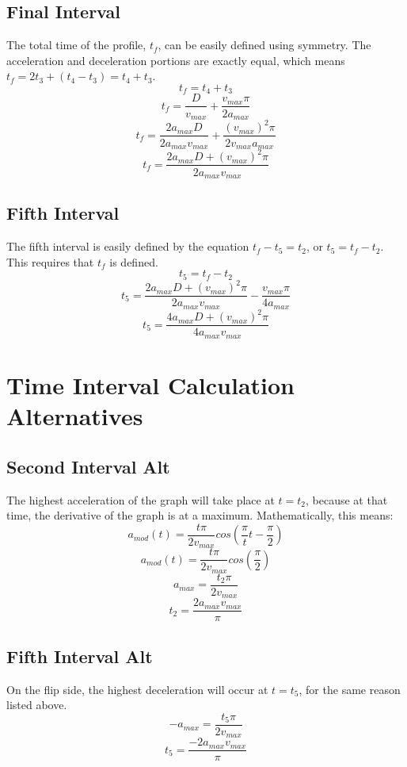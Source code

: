 \documentclass[a4paper,12pt]{report}
\newcommand{\tab}{\hspace{20pt}}
\begin{document}
	\section{Final Interval}
	\tab The total time of the profile, $t_f$, can be easily defined using symmetry. The acceleration and deceleration portions are exactly equal, which means $t_f = 2t_3 + (t_4 - t_3) = t_4 + t_3$.
	\[t_f = t_4 + t_3\]
	\[t_f = \frac{D}{v_{max}} + \frac{v_{max}\pi}{2a_{max}}\]
	\[t_f = \frac{2a_{max}D}{2a_{max}v_{max}} + \frac{(v_{max})^2\pi}{2v_{max}a_{max}}\]
	\[t_f = \frac{2a_{max}D + (v_{max})^2\pi}{2a_{max}v_{max}}\]
	
	\section{Fifth Interval}
	\tab The fifth interval is easily defined by the equation $t_f - t_5 = t_2$, or $t_5 = t_f - t_2$. This requires that $t_f$ is defined.
	\[t_5 = t_f - t_2\]
	\[t_5 = \frac{2a_{max}D + (v_{max})^2\pi}{2a_{max}v_{max}} - \frac{v_{max}\pi}{4a_{max}}\]
	\[t_5 = \frac{4a_{max}D + (v_{max})^2\pi}{4a_{max}v_{max}}\]
	
	\chapter{Time Interval Calculation Alternatives}
	\section{Second Interval Alt}
	\tab The highest acceleration of the graph will take place at $t = t_2$, because at that time, the derivative of the graph is at a maximum. Mathematically, this means:
	\[a_{mod}(t) = \frac{t\pi}{2v_{max}} cos(\frac{\pi}{t}t - \frac{\pi}{2})\]
	\[a_{mod}(t) = \frac{t\pi}{2v_{max}} cos(\frac{\pi}{2})\]
	\[a_{max} = \frac{t_2\pi}{2v_{max}}\]
	\[t_2 = \frac{2a_{max}v_{max}}{\pi}\]
	
	\section{Fifth Interval Alt}
	\tab On the flip side, the highest deceleration will occur at $t = t_5$, for the same reason listed above.
	\[-a_{max} = \frac{t_5\pi}{2v_{max}}\]
	\[t_5 = \frac{-2a_{max}v_{max}}{\pi}\]
	
\end{document}
